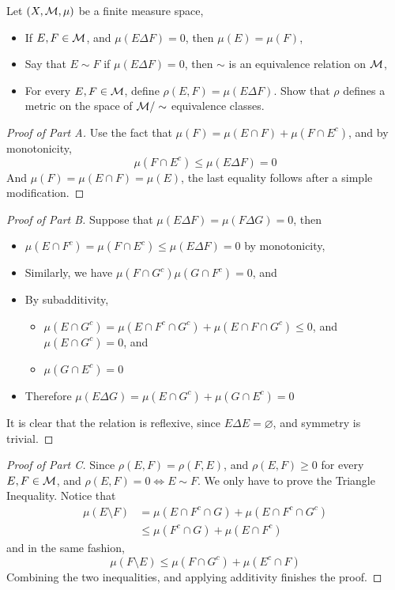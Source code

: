 \documentclass[../../main.tex]{subfiles}
\begin{document}
\begin{wts}
Let $(X,\mathcal{M},\mu)$ be a finite measure space,
\begin{itemize}
    \item If $E,F\in\mathcal{M}$, and $\mu(E\Delta F)=0$, then $\mu(E)=\mu(F)$,
    \item Say that $E\sim F$ if $\mu(E\Delta F)=0$, then $\sim$ is an equivalence relation on $\mathcal{M}$,
    \item For every $E,F\in\mathcal{M}$, define $\rho(E,F)=\mu(E\Delta F)$. Show that $\rho$ defines a metric on the space of $\mathcal{M}/\sim$ equivalence classes.
\end{itemize}
\end{wts}
\begin{proof}[Proof of Part A]
    Use the fact that $\mu(F)=\mu(E\cap F)+\mu(F\cap E^c)$, and by monotonicity,
    \[
    \mu(F\cap E^c)\leq \mu(E\Delta F)=0
    \]
    And $\mu(F)=\mu(E\cap F)=\mu(E)$, the last equality follows after a simple modification.
\end{proof}
\begin{proof}[Proof of Part B]
    Suppose that $\mu(E\Delta F)=\mu(F\Delta G)=0$, then
    \begin{itemize}
        \item $\mu(E\cap F^c)=\mu(F\cap E^c)\leq \mu(E\Delta F)=0$ by monotonicity,
        \item Similarly, we have $\mu(F\cap G^c)\mu(G\cap F^c)=0$, and
        \item By subadditivity, 
        \begin{itemize}
            \item $\mu(E\cap G^c)=\mu(E\cap F^c\cap G^c) + \mu(E\cap F\cap G^c)\leq 0$, and $\mu(E\cap G^c)=0$, and
            \item $\mu(G\cap E^c)=0$
        \end{itemize}
        \item Therefore $\mu(E\Delta G)=\mu(E\cap G^c) + \mu(G\cap E^c)=0$
    \end{itemize}
    It is clear that the relation is reflexive, since $E\Delta E =\varnothing$, and symmetry is trivial.
\end{proof}
\begin{proof}[Proof of Part C]
    Since $\rho(E,F)=\rho(F,E)$, and $\rho(E,F)\geq 0$ for every $E,F\in\mathcal{M}$, and $\rho(E,F)=0\iff E\sim F$. We only have to prove the Triangle Inequality. Notice that
    \begin{align*}
    \mu(E\setminus F) &= \mu(E\cap F^c\cap G) + \mu(E\cap F^c\cap G^c)\\
    &\leq \mu(F^c\cap G) + \mu(E\cap F^c)
    \end{align*}
    and in the same fashion,
    \[
    \mu(F\setminus E) \leq \mu(F\cap G^c) + \mu(E^c\cap F)
    \]
    Combining the two inequalities, and applying additivity finishes the proof.
\end{proof}
\end{document}

